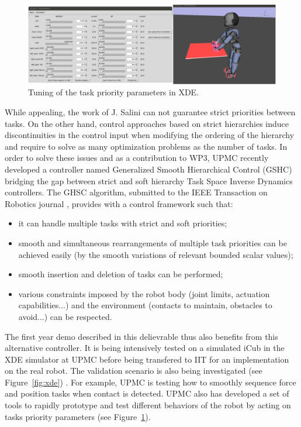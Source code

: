 \documentclass[12pt,a4paper,twoside]{article}
\begin{document}
\begin{figure} [!ht]
\begin{center}
\includegraphics[width=0.9\hsize]{images/s12.png}
\end{center}
\caption{Tuning of the task priority parameters in XDE.}
\label{fig:params}
\end{figure}


While appealing, the work of J. Salini can not guarantee strict priorities between tasks. On the other hand, control approaches based on strict hierarchies induce discontinuities in the control input when modifying the ordering of the hierarchy and require to solve as many optimization problems as the number of tasks. In order to solve these issues and as a contribution to WP3, UPMC recently developed a controller named Generalized Smooth Hierarchical Control (GSHC) bridging the gap between strict and soft hierarchy Task Space Inverse Dynamics controllers. The GHSC algorithm, submitted to the IEEE Transaction on Robotics journal \cite{liu2013}, provides with a control framework such that:
\begin{itemize}
	\item it can handle multiple tasks with strict and soft priorities;
	\item smooth and simultaneous rearrangements of multiple task priorities can be achieved easily (by the smooth variations of relevant bounded scalar values);
	\item smooth insertion and deletion of tasks can be performed;
	\item various constraints imposed by the robot body (joint limits, actuation capabilities...) and the environment (contacts to maintain, obstacles to avoid...) can be respected.
\end{itemize}

The first year demo described in this delievrable thus also benefits from this alternative controller. It is being intensively tested on a simulated iCub in the XDE simulator at UPMC before being transfered to IIT for an implementation on the real robot. The validation scenario is also being investigated (see Figure~\ref{fig:xde}) . For example, UPMC is testing how to smoothly sequence force and position tasks when contact is detected. UPMC also has developed a set of tools to rapidly prototype and test different behaviors of the robot by acting on tasks priority parameters (see Figure~\ref{fig:params}).
\end{document}
